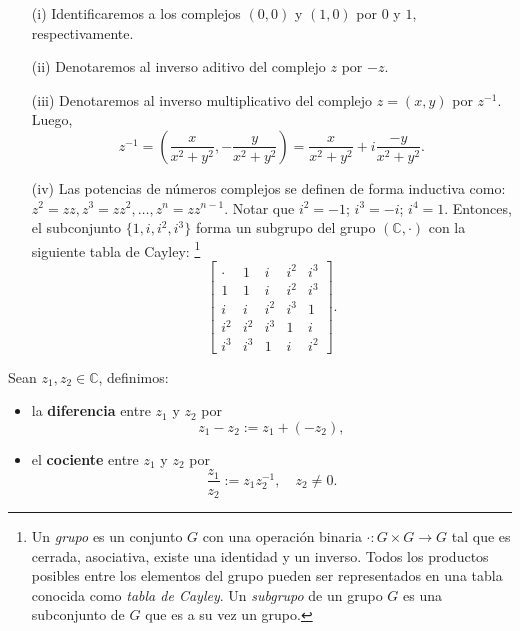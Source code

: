 \begin{itemize}
\item[(i)] Identificaremos a los complejos $(0,0)$ y $(1,0)$ por $0$ y $1$, respectivamente.

\item[(ii)] Denotaremos al inverso aditivo del complejo $z$ por $-z$.

\item[(iii)] Denotaremos al inverso multiplicativo del complejo $z = (x,y)$ por $z^{-1}$. Luego,
$$z^{-1} = \left( \frac{x}{x^2 + y^2}, - \frac{y}{x^2+y^2} \right) = \frac{x}{x^2 + y^2} + i \frac{-y}{x^2+y^2}.$$

\item[(iv)] Las potencias de números complejos se definen de forma inductiva como: $z^2 = zz, z^3 = zz^2, \dots, z^n = z z^{n-1}$. Notar que $i^2 = -1$; $i^3 = -i$; $i^4 = 1$. Entonces, el subconjunto $\{1, i,i^2, i^3\}$ forma un subgrupo del grupo $(\mathbb{C}, \cdot)$ con la siguiente tabla de Cayley: \footnote{Un \textit{grupo} es un conjunto $G$ con una operación binaria $\cdot: G \times G \rightarrow G$ tal que es cerrada, asociativa, existe una identidad y un inverso. Todos los productos posibles entre los elementos del grupo pueden ser representados en una tabla conocida como \textit{tabla de Cayley}. Un \textit{subgrupo} de un grupo $G$ es una subconjunto de $G$ que es a su vez un grupo.}
\begin{equation*}
\left[ \begin{array}{c|cccc}
\cdot & 1 & i & i^2 & i^3 \\
\hline
1 & 1 & i & i^2 & i^3 \\
i & i & i^2 & i^3 & 1 \\
i^2 & i^2 & i^3 & 1 & i \\
i^3 & i^3 & 1 & i & i^2
\end{array} \right] .
\end{equation*}
\end{itemize}

\newpage

\begin{defi}
Sean $z_1, z_2 \in \mathbb{C}$, definimos:

\begin{itemize}
\item la \textbf{diferencia} entre $z_1$ y $z_2$ por
$$z_1 - z_2 := z_1 + (-z_2),$$

\item el \textbf{cociente}  entre $z_1$ y $z_2$ por
$$\frac{z_1}{z_2} := z_1 z_2^{-1}, \quad z_2 \neq 0.$$

\end{itemize}
\end{defi}


